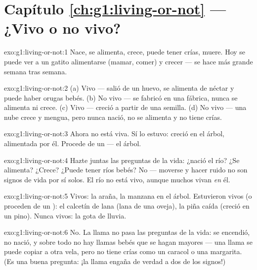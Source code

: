 \section*{Capítulo \ref{ch:g1:living-or-not} --- ¿Vivo o no vivo?}

\begin{solution}{exo:g1:living-or-not:1}
Nace, se alimenta, crece, puede tener crías, muere. Hoy se puede ver
a un gatito alimentarse (mamar, comer) y crecer --- se hace más
grande semana tras semana.
\end{solution}

\begin{solution}{exo:g1:living-or-not:2}
(a) Vivo --- salió de un huevo, se alimenta de néctar y puede haber
orugas bebés. (b) No vivo --- se fabricó en una fábrica, nunca se
alimenta ni crece. (c) Vivo --- creció a partir de una semilla.
(d) No vivo --- una nube crece y mengua, pero nunca nació, no se
alimenta y no tiene crías.
\end{solution}

\begin{solution}{exo:g1:living-or-not:3}
Ahora no está viva. Sí lo estuvo: creció en el árbol, alimentada por
él. Procede de un  --- el árbol.
\end{solution}

\begin{solution}{exo:g1:living-or-not:4}
Hazte juntas las preguntas de la vida: ¿nació el río? ¿Se alimenta?
¿Crece? ¿Puede tener ríos bebés? No --- moverse y hacer ruido no son
signos de vida por sí solos. El río no está vivo, aunque muchos  vivan \emph{en} él.
\end{solution}

\begin{solution}{exo:g1:living-or-not:5}
Vivos: la araña, la manzana en el árbol. Estuvieron vivos (o proceden
de un ): el calcetín de lana (lana de una oveja), la piña
caída (creció en un pino). Nunca vivos: la gota de lluvia.
\end{solution}

\begin{solution}{exo:g1:living-or-not:6}
No. La llama no pasa las preguntas de la vida: se encendió, no nació,
y sobre todo no hay llamas bebés que se hagan mayores --- una llama
se puede copiar a otra vela, pero no tiene crías como un caracol o
una margarita. (Es una buena pregunta: ¡la llama engaña de verdad a
dos de los signos!)
\end{solution}


